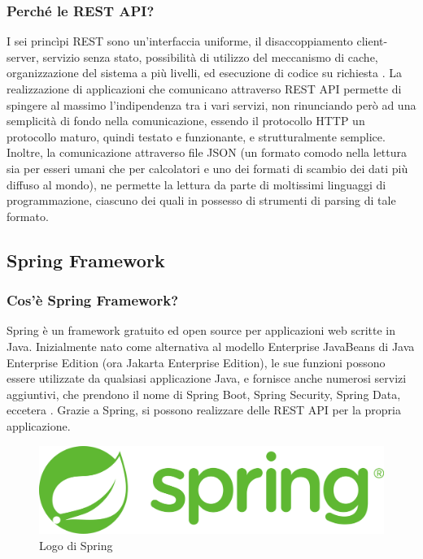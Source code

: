             \subsubsection{Perché le REST API?}
                I sei princìpi REST sono un'interfaccia uniforme, il disaccoppiamento client-server, servizio senza stato, possibilità di utilizzo del meccanismo di cache, organizzazione del sistema a più livelli, ed esecuzione di codice su richiesta \cite{IBM1}. La realizzazione di applicazioni che comunicano attraverso REST API permette di spingere al massimo l'indipendenza tra i vari servizi, non rinunciando però ad una semplicità di fondo nella comunicazione, essendo il protocollo HTTP un protocollo maturo, quindi testato e funzionante, e strutturalmente semplice. Inoltre, la comunicazione attraverso file JSON (un formato comodo nella lettura sia per esseri umani che per calcolatori e uno dei formati di scambio dei dati più diffuso al mondo), ne permette la lettura da parte di moltissimi linguaggi di programmazione, ciascuno dei quali in possesso di strumenti di parsing di tale formato.
            
        \subsection{Spring Framework}
            \subsubsection{Cos'è Spring Framework?}
                Spring è un framework gratuito ed open source per applicazioni web scritte in Java. Inizialmente nato come alternativa al modello Enterprise JavaBeans di Java Enterprise Edition (ora Jakarta Enterprise Edition), le sue funzioni possono essere utilizzate da qualsiasi applicazione Java, e fornisce anche numerosi servizi aggiuntivi, che prendono il nome di Spring Boot, Spring Security, Spring Data, eccetera \cite{Wikipedia4}. Grazie a Spring, si possono realizzare delle REST API per la propria applicazione.
            \begin{figure}[htbp!]
                \centering
                \includegraphics[width=0.5\linewidth]{Immagini/System Design/Spring.png}
                \caption{Logo di Spring}
            \end{figure}
